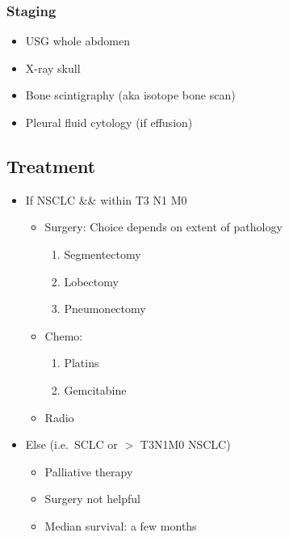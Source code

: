 \documentclass[
  12pt,
]{memoir}
\providecommand{\tightlist}{%
  \setlength{\itemsep}{0pt}\setlength{\parskip}{0pt}}
\begin{document}
\hypertarget{staging}{%
\subsubsection{Staging}\label{staging}}

\begin{itemize}
\tightlist
\item
  USG whole abdomen
\item
  X-ray skull
\item
  Bone scintigraphy (aka isotope bone scan)
\item
  Pleural fluid cytology (if effusion)
\end{itemize}

\hypertarget{treatment}{%
\subsection{Treatment}\label{treatment}}

\begin{itemize}
\tightlist
\item
  If NSCLC \&\& within T3 N1 M0

  \begin{itemize}
  \tightlist
  \item
    Surgery: Choice depends on extent of pathology

    \begin{enumerate}
    \def\labelenumi{\arabic{enumi}.}
    \tightlist
    \item
      Segmentectomy
    \item
      Lobectomy
    \item
      Pneumonectomy
    \end{enumerate}
  \item
    Chemo:

    \begin{enumerate}
    \def\labelenumi{\arabic{enumi}.}
    \tightlist
    \item
      Platins
    \item
      Gemcitabine
    \end{enumerate}
  \item
    Radio
  \end{itemize}
\item
  Else (i.e.~SCLC or \(>\) T3N1M0 NSCLC)

  \begin{itemize}
  \tightlist
  \item
    Palliative therapy
  \item
    Surgery not helpful
  \item
    Median survival: a few months
  \end{itemize}
\end{itemize}
\end{document}
